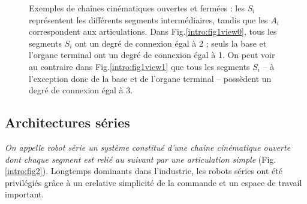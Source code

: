 \begin{figure}[!ht]
  \centering
\hfill
    \caption{\footnotesize{Exemples de cha\^ines cinématiques ouvertes et 
fermées : les $S_i$ représentent les différents segments intermédiaires, tandis 
que les $A_i$ correspondent aux articulations. Dans Fig.\ref{intro:fig1view0}, 
tous les segments $S_i$ ont un degré de connexion égal à 2 ; seuls la base et 
l'organe terminal ont un degré de connexion égal à 1. On peut voir au 
contraire dans Fig.\ref{intro:fig1view1} que tous les segments $S_i$ -- \`a 
l'exception donc de la base et de l'organe terminal -- possèdent un degré de 
connexion \'egal à 3.}}
\label{intro:fig1}
\end{figure}

\subsection{Architectures séries} \label{chap0-0-1}

{\it On appelle robot série un système constitué d'une chaîne cinématique 
ouverte dont chaque segment est relié au suivant par une articulation simple} 
(Fig.\ref{intro:fig2}). Longtemps dominants dans l'industrie, les robots séries 
ont été privilégiés grâce à un erelative simplicité de la commande et un espace 
de travail important.


